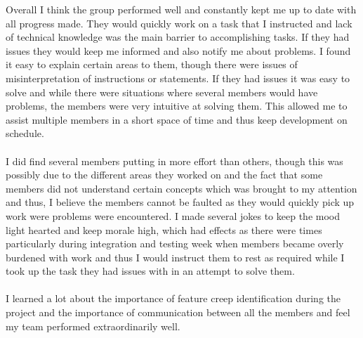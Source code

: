 \documentclass[12pt, portrait]{article}
\begin{document}
Overall I think the group performed well and constantly kept me up to date with all progress made. They would quickly work on a task that I instructed and lack of technical knowledge was the main barrier to accomplishing tasks. If they had issues they would keep me informed and also notify me about problems. I found it easy to explain certain areas to them, though there were issues of misinterpretation of instructions or statements. If they had issues it was easy to solve and while there were situations where several members would have problems, the members were very intuitive at solving them. This allowed me to assist multiple members in a short space of time and thus keep development on schedule.~\\\\
I did find several members putting in more effort than others, though this was possibly due to the different areas they worked on and the fact that some members did not understand certain concepts which was brought to my attention and thus, I believe the members cannot be faulted as they would quickly pick up work were problems were encountered. I made several jokes to keep the mood light hearted and keep morale high, which had effects as there were times particularly during integration and testing week when members became overly burdened with work and thus I would instruct them to rest as required while I took up the task they had issues with in an attempt to solve them.~\\\\
I learned a lot about the importance of feature creep identification during the project and the importance of communication between all the members and feel my team performed extraordinarily well.
\end{document}
